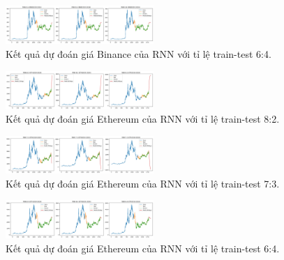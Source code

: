 \documentclass{ieeeojies}
\begin{document}
\begin{figure}[h]
    \centering
    \includegraphics[width=0.5\textwidth]{bibliography/pictures/RNNbnb6_4.png}
    \caption{Kết quả dự đoán giá Binance của RNN với tỉ lệ train-test 6:4.}
\end{figure}
\begin{figure}[h]
    \centering
    \includegraphics[width=0.5\textwidth]{bibliography/pictures/RNNeth8_2.png}
    \caption{Kết quả dự đoán giá Ethereum của RNN với tỉ lệ train-test 8:2.}
\end{figure}
\begin{figure}[h]
    \centering
    \includegraphics[width=0.5\textwidth]{bibliography/pictures/RNNeth7_3.png}
    \caption{Kết quả dự đoán giá Ethereum của RNN với tỉ lệ train-test 7:3.}
\end{figure}
\begin{figure}[h]
    \centering
    \includegraphics[width=0.5\textwidth]{bibliography/pictures/RNNeth6_4.png}
    \caption{Kết quả dự đoán giá Ethereum của RNN với tỉ lệ train-test 6:4.}
\end{figure}
\end{document}
